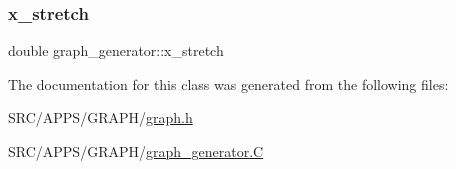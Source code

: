 \mbox{\label{classgraph__generator_a22efb4d4fcc84ad37e546e1821e4d93c}} 
\subsubsection{\texorpdfstring{x\+\_\+stretch}{x\_stretch}}
{\footnotesize\ttfamily double graph\+\_\+generator\+::x\+\_\+stretch}



The documentation for this class was generated from the following files\+:\begin{DoxyCompactItemize}
\item 
S\+R\+C/\+A\+P\+P\+S/\+G\+R\+A\+P\+H/\mbox{\hyperlink{graph_8h}{graph.\+h}}\item 
S\+R\+C/\+A\+P\+P\+S/\+G\+R\+A\+P\+H/\mbox{\hyperlink{graph__generator_8_c}{graph\+\_\+generator.\+C}}\end{DoxyCompactItemize}
